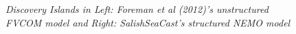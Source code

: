 \documentclass[letterpaper,12pt]{article}
\begin{document}
\begin{figure}[h]
\noindent{}
\caption{\protect\it{\small Discovery Islands in Left: Foreman et al
    (2012)'s unstructured FVCOM model and Right: SalishSeaCast's structured NEMO model}}
\label{plt:unstructured}
\end{figure}
\end{document}
